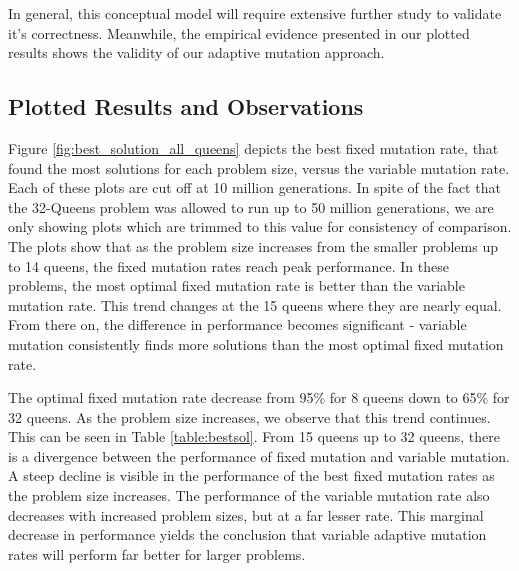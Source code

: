 \documentclass[conference]{IEEEtran}
\begin{document}
In general, this conceptual model will require extensive further study to validate it's correctness. Meanwhile, the empirical evidence presented in our plotted results shows the validity of our adaptive mutation approach.

\subsection{Plotted Results and Observations}
Figure \ref{fig:best_solution_all_queens} depicts the best fixed mutation rate, that found the most solutions for each problem size, versus the variable mutation rate. Each of these plots are cut off at 10 million generations. In spite of the fact that the 32-Queens problem was allowed to run up to 50 million generations, we are only showing plots which are trimmed to this value for consistency of comparison. The plots show that as the problem size increases from the smaller problems up to 14 queens, the fixed mutation rates reach peak performance. In these problems, the most optimal fixed mutation rate is better than the variable mutation rate. This trend changes at the 15 queens where they are nearly equal. From there on, the difference in performance becomes significant - variable mutation consistently finds more solutions than the most optimal fixed mutation rate. 

The optimal fixed mutation rate decrease from 95\% for 8 queens down to 65\% for 32 queens. As the problem size increases, we observe that this trend continues. This can be seen in Table \ref{table:bestsol}. From 15 queens up to 32 queens, there is a divergence between the performance of fixed mutation and variable mutation. A steep decline is visible in the performance of the best fixed mutation rates as the problem size increases. The performance of the variable mutation rate also decreases with increased problem sizes, but at a far lesser rate. This marginal decrease in performance yields the conclusion that variable adaptive mutation rates will perform far better for larger problems.
\end{document}

